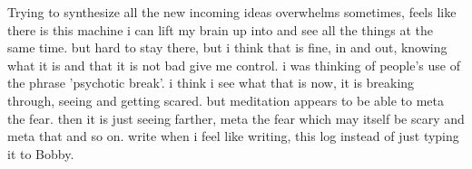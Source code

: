 \documentclass[12pt]{article}
\title{}
\begin{document}
\maketitle
Trying to synthesize all the new incoming ideas overwhelms sometimes, feels like there is this machine i can lift my brain up into and see all the things
at the same time. but hard to stay there, but i think that is fine, in and out, knowing what it is and that it is not bad give me control. i was thinking
of people's use of the phrase 'psychotic break'.  i think i see what that is now, it is breaking through, seeing and getting scared.  but meditation appears
to be able to meta the fear.  then it is just seeing farther, meta the fear which may itself be scary and meta that and so on.  write when i feel
like writing, this log instead of just typing it to Bobby.
\end{document}
